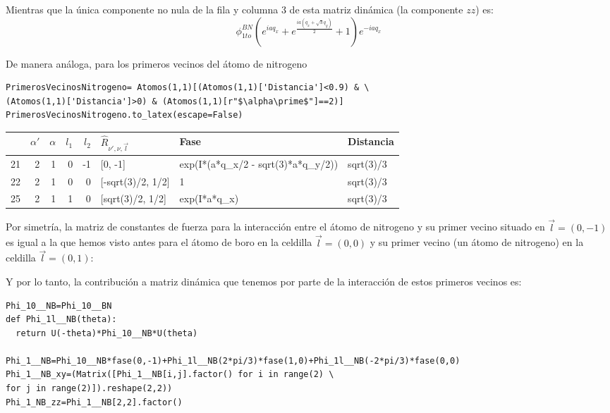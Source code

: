 \documentclass[12pt,a4paper]{article}
\begin{document}
Mientras que la única componente no nula de la fila y columna 3 de esta matriz dinámica (la componente \(zz\)) es:
\begin{equation}
\label{eq:9}
\phi^{BN}_{1to} \left(e^{i a q_{x}} + e^{\frac{i a \left(q_{x} + \sqrt{3} q_{y}\right)}{2}} + 1\right) e^{- i a q_{x}}
\end{equation}

\newpage

De manera análoga, para los primeros vecinos del átomo de nitrogeno

\begin{verbatim}
PrimerosVecinosNitrogeno= Atomos(1,1)[(Atomos(1,1)['Distancia']<0.9) & \
(Atomos(1,1)['Distancia']>0) & (Atomos(1,1)[r"$\alpha\prime$"]==2)]
PrimerosVecinosNitrogeno.to_latex(escape=False)
\end{verbatim}

\begin{tabular}{lrrrrlll}
\toprule
{} &  $\alpha\prime$ &  $\alpha$ &  $l_1$ &  $l_2$ & $\hat R_{\nu\prime,\nu,\vec l}$ &                                Fase &  Distancia \\
\midrule
21 &               2 &         1 &      0 &     -1 &                         [0, -1] &  exp(I*(a*q_x/2 - sqrt(3)*a*q_y/2)) &  sqrt(3)/3 \\
22 &               2 &         1 &      0 &      0 &               [-sqrt(3)/2, 1/2] &                                   1 &  sqrt(3)/3 \\
25 &               2 &         1 &      1 &      0 &                [sqrt(3)/2, 1/2] &                        exp(I*a*q_x) &  sqrt(3)/3 \\
\bottomrule
\end{tabular}

\vspace{0.5cm}

Por simetría, la matriz de constantes de fuerza para la interacción entre el átomo de nitrogeno y su primer vecino situado en \(\vec l= (0,-1)\) es igual a la que hemos visto antes para el átomo de boro en la celdilla \(\vec l= (0,0)\) y su primer vecino (un átomo de nitrogeno) en la celdilla \(\vec l= (0,1)\):

Y por lo tanto, la contribución a matriz dinámica que tenemos por parte de la interacción de estos primeros vecinos es:

\begin{verbatim}
Phi_10__NB=Phi_10__BN
def Phi_1l__NB(theta):
  return U(-theta)*Phi_10__NB*U(theta)

Phi_1__NB=Phi_10__NB*fase(0,-1)+Phi_1l__NB(2*pi/3)*fase(1,0)+Phi_1l__NB(-2*pi/3)*fase(0,0)
Phi_1__NB_xy=(Matrix([Phi_1__NB[i,j].factor() for i in range(2) \
for j in range(2)]).reshape(2,2))
Phi_1_NB_zz=Phi_1__NB[2,2].factor()
\end{verbatim}
\end{document}
